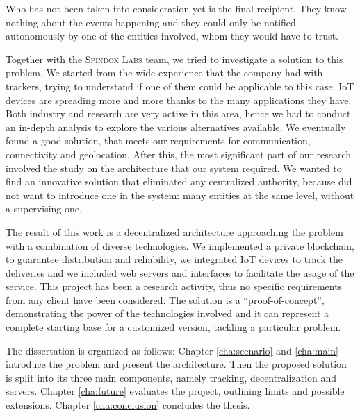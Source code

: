 Who has not been taken into consideration yet is the final recipient. They know nothing about the events happening and they could only be notified autonomously by one of the entities involved, whom they would have to trust. 

Together with the \textsc{Spindox Labs} team, we tried to investigate a solution to this problem. We started from the wide experience that the company had with trackers, trying to understand if one of them could be applicable to this case. IoT devices are spreading more and more thanks to the many applications they have. Both industry and research are very active in this area, hence we had to conduct an in-depth analysis to explore the various alternatives available. We eventually found a good solution, that meets our requirements for communication, connectivity and geolocation. After this, the most significant part of our research involved the study on the architecture that our system required. We wanted to find an innovative solution that eliminated any centralized authority, because did not want to introduce one in the system: many entities at the same level, without a supervising one. 

The result of this work is a decentralized architecture approaching the problem with a combination of diverse technologies. We implemented a private blockchain, to guarantee distribution and reliability, we integrated IoT devices to track the deliveries and we included web servers and interfaces to facilitate the usage of the service. This project has been a research activity, thus no specific requirements from any client have been considered. The solution is a ``proof-of-concept'', demonstrating the power of the technologies involved and it can represent a complete starting base for a customized version, tackling a particular problem.

The dissertation is organized as follows: Chapter \ref{cha:scenario} and \ref{cha:main} introduce the problem and present the architecture. Then the proposed solution is split into its three main components, namely tracking, decentralization and servers. Chapter \ref{cha:future} evaluates the project, outlining limits and possible extensions. Chapter \ref{cha:conclusion} concludes the thesis.

\newpage